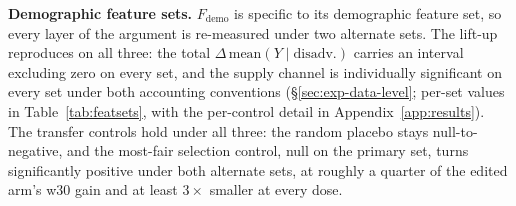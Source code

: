 \textbf{Demographic feature sets.} $F_{\mathrm{demo}}$ is specific to its
demographic feature set, so every layer of the argument is re-measured under
two alternate sets. The
lift-up reproduces on all three: the total
$\Delta\,\mathrm{mean}(Y \mid \mathrm{disadv.})$ carries an interval
excluding zero on every set, and the supply channel is individually significant
on every set under both accounting conventions
(\S\ref{sec:exp-data-level}; per-set values in Table~\ref{tab:featsets}, with
the per-control detail in Appendix~\ref{app:results}).
The transfer controls hold under all three: the random placebo stays
null-to-negative, and the most-fair selection control, null on the primary set,
turns significantly positive under both alternate sets, at roughly a quarter of
the edited arm's w30 gain and at least $3\times$ smaller at every dose.

